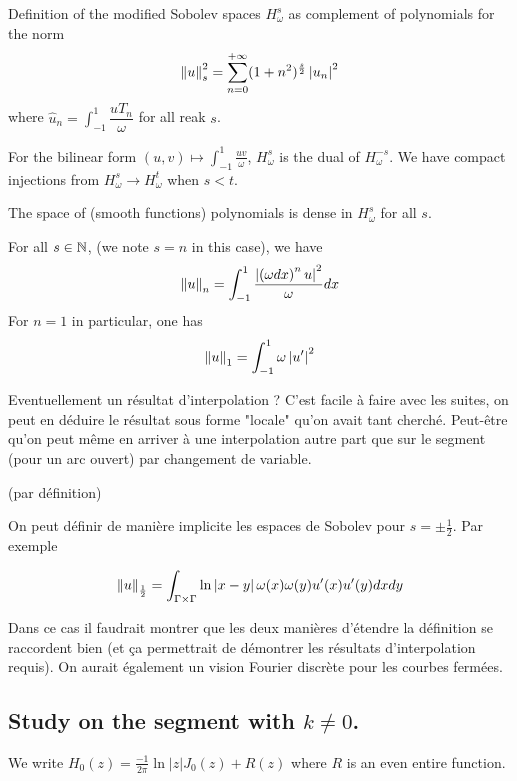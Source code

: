 \documentclass[]{article}
\begin{document}
\begin{Def}
	Definition of the modified Sobolev spaces $H^s_{\omega}$ as complement of polynomials for the norm 
	\[ \left\|u\right\|_s^2 = \sum_{n=0}^{+\infty} (1+n^2)^{\frac{s}{2}}\left\lvert {u}_n \right\rvert^2\]
	where $\hat{u}_n = \int_{-1}^1 \dfrac{uT_n}{\omega}$ for all reak $s$.  
\end{Def}
\begin{The}
	For the bilinear form $(u,v)\mapsto\int_{-1}^{1}\frac{uv}{\omega}$, $H^s_{\omega}$ is the dual of $H^{-s}_{\omega}$. We have compact injections from $H^s_{\omega} \to H^t_{\omega}$ when $s < t$. 
\end{The}
\begin{The}
	The space of (smooth functions) polynomials is dense in $H^s_\omega$ for all $s$. 
\end{The}
\begin{The}
	For all $s \in \mathbb{N}$, (we note $s=n$ in this case), we have 
	\[ \left\|u\right\|_n = \int_{-1}^{1} \dfrac{\left\lvert \left(\omega dx\right)^n u \right\rvert^2}{\omega}dx\] 
	For $n=1$ in particular, one has 
	\[ \left\|u\right\|_{1} = \int_{-1}^{1} \omega \left\lvert u' \right\rvert^2\]
\end{The}
\begin{The}
	Eventuellement un résultat d'interpolation ? C'est facile à faire avec les suites, on peut en déduire le résultat sous forme "locale" qu'on avait tant cherché. Peut-être qu'on peut même en arriver à une interpolation autre part que sur le segment (pour un arc ouvert) par changement de variable. 
\end{The}
(par définition)

\begin{The}
	On peut définir de manière implicite les espaces de Sobolev pour $s = \pm \frac{1}{2}$. Par exemple 
	
	\[\left\|u\right\|_{\frac{1}{2}} = \int_{\Gamma\times \Gamma} \ln\left\lvert x-y \right\rvert\omega(x)\omega(y) u'(x)u'(y)dxdy\]
\end{The}
Dans ce cas il faudrait montrer que les deux manières d'étendre la définition se raccordent bien (et ça permettrait de démontrer les résultats d'interpolation requis). On aurait également un vision Fourier discrète pour les courbes fermées. 

\subsection{Study on the segment with $k \neq 0$.}

We write $H_0(z) = \frac{-1}{2\pi} \ln|z| J_0(z) + R(z)$ where $R$ is an even entire function. 
\end{document}
